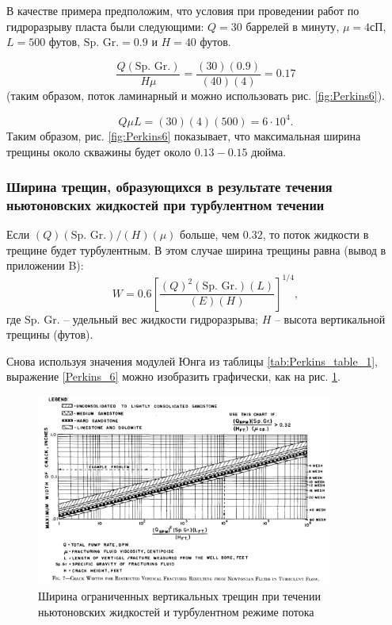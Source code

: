 \documentclass[a4paper, 12pt]{article}
\newcommand{\beq}{\begin{equation}}
\newcommand{\eeq}{\end{equation}}
\begin{document}
В качестве примера предположим, что условия при проведении работ по гидроразрыву пласта были следующими:
$Q=30\text{ баррелей в минуту}$, $\mu=4\text{сП}$, $L=500\text{ футов}$, $\text{Sp. Gr.}=0.9$ и $H=40\text{ футов}$.

$$
\frac{Q(\text{Sp. Gr.})}{H\mu}=\frac{(30)(0.9)}{(40)(4)}=0.17
$$
(таким образом, поток ламинарный и можно использовать рис. \ref{fig:Perkins6}).

$$
Q\mu L=(30)(4)(500)=6\cdot 10^4.
$$
Таким образом, рис. \ref{fig:Perkins6} показывает, что максимальная ширина трещины около скважины будет около $0.13-0.15$ дюйма.

\subsubsection{Ширина трещин, образующихся в результате течения ньютоновских жидкостей при турбулентном течении}

Если $(Q)(\text{Sp. Gr.})/(H)(\mu)$ больше, чем $0.32$, то поток жидкости в трещине будет турбулентным.
В этом случае ширина трещины равна (вывод в приложении B):
\beq\label{Perkins_6}
W=0.6\left[\frac{(Q)^2(\text{Sp. Gr.})(L)}{(E)(H)}\right]^{1/4},
\tag{6}
\eeq
где $\text{Sp. Gr.}$ -- удельный вес жидкости гидроразрыва;\newline
$H$ -- высота вертикальной трещины (футов).

Снова используя значения модулей Юнга из таблицы \ref{tab:Perkins_table_1}, выражение \eqref{Perkins_6} можно изобразить графически, как на рис. \ref{fig:Perkins7}.

\begin{figure}[H]
\center
\includegraphics[width=0.87\textwidth]{Perkins_7}
\caption{Ширина ограниченных вертикальных трещин при течении ньютоновских жидкостей и турбулентном режиме потока}
\label{fig:Perkins7}
\end{figure}
\end{document}
